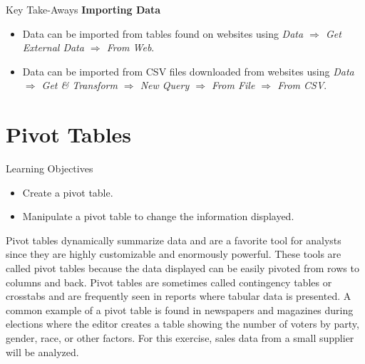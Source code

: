 \begin{center}
	\begin{tkwbox}{Key Take-Aways}
		\textbf{Importing Data}
		\\
		\begin{itemize}
			\setlength{\itemsep}{0pt}
			\setlength{\parskip}{0pt}
			\setlength{\parsep}{0pt}
			
			\item Data can be imported from tables found on websites using \textit{Data $ \Rightarrow $ Get External Data $ \Rightarrow $ From Web}. 
			\item Data can be imported from CSV files downloaded from websites using \textit{Data $ \Rightarrow $ Get \& Transform $ \Rightarrow $ New Query $ \Rightarrow $ From File $ \Rightarrow $ From CSV}.
			
		\end{itemize}
	\end{tkwbox}
\end{center}

\section{Pivot Tables}

\begin{center}
	\begin{objbox}{Learning Objectives}
		\begin{itemize}
			\setlength{\itemsep}{0pt}
			\setlength{\parskip}{0pt}
			\setlength{\parsep}{0pt}

			\item Create a pivot table.
			\item Manipulate a pivot table to change the information displayed.
			
		\end{itemize}
	\end{objbox}
\end{center}

Pivot tables dynamically summarize data and are a favorite tool for analysts since they are highly customizable and enormously powerful. These tools are called pivot tables because the data displayed can be easily pivoted from rows to columns and back. Pivot tables are sometimes called contingency tables or crosstabs and are frequently seen in reports where tabular data is presented. A common example of a pivot table is found in newspapers and magazines during elections where the editor creates a table showing the number of voters by party, gender, race, or other factors. For this exercise, sales data from a small supplier will be analyzed.

